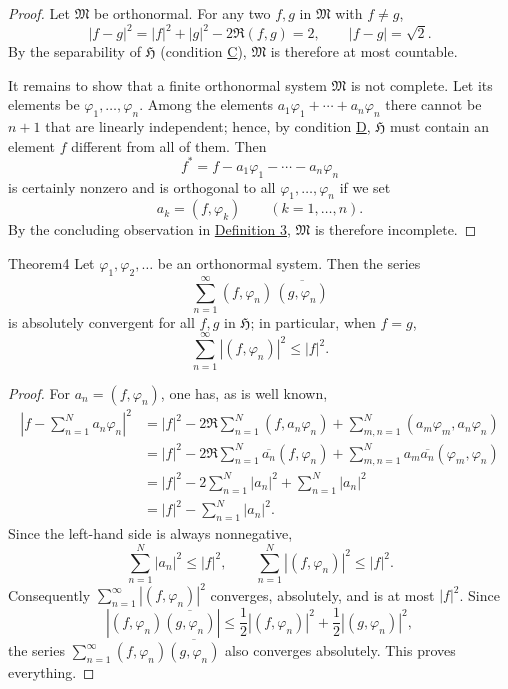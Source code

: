 ﻿\documentclass[paper=b5,fontsize=13pt,bookmarkpackage=false,twoside]{scrartcl}
\begin{document}
\begin{proof}
Let $\mathfrak M$ be orthonormal. For any two $f,g$ in $\mathfrak M$ with $f\ne g$,
\[
 |f-g|^2=|f|^2+|g|^2-2\Re(f,g)=2,
 \qquad
 |f-g|=\sqrt2.
\]
By the separability of $\mathfrak H$ (condition \hyperref[axiom:C]{C}), $\mathfrak M$ is therefore at most countable.

It remains to show that a finite orthonormal system $\mathfrak M$ is not complete. Let its elements be $\varphi_1,\ldots,\varphi_n$. Among the elements $a_1\varphi_1+\cdots+a_n\varphi_n$ there cannot be $n+1$ that are linearly independent; hence, by condition \hyperref[axiom:D]{D}, $\mathfrak H$ must contain an element $f$ different from all of them. Then
\[
 f^*=f-a_1\varphi_1-\cdots-a_n\varphi_n
\]
is certainly nonzero and is orthogonal to all $\varphi_1,\ldots,\varphi_n$ if we set
\[
 a_k=(f,\varphi_k)
 \qquad(k=1,\ldots,n).
\]
By the concluding observation in \hyperref[def:3]{Definition 3}, $\mathfrak M$ is therefore incomplete.
\end{proof}

\begin{namedstatement}{Theorem}{4}\label{thm:4}
Let $\varphi_1,\varphi_2,\ldots$ be an orthonormal system. Then the series
\[
 \sum_{n=1}^{\infty}(f,\varphi_n)\,
 \overline{(g,\varphi_n)}
\]
is absolutely convergent for all $f,g$ in $\mathfrak H$; in particular, when $f=g$,
\[
 \sum_{n=1}^{\infty}|(f,\varphi_n)|^2\le|f|^2.
\]
\end{namedstatement}

\begin{proof}
For $a_n=(f,\varphi_n)$, one has, as is well known,
\begin{align*}
 \left|f-\sum_{n=1}^{N}a_n\varphi_n\right|^2
 &=
 |f|^2
 -2\Re\sum_{n=1}^{N}(f,a_n\varphi_n)
 +\sum_{m,n=1}^{N}(a_m\varphi_m,a_n\varphi_n)\\
 &=
 |f|^2
 -2\Re\sum_{n=1}^{N}\overline{a_n}(f,\varphi_n)
 +\sum_{m,n=1}^{N}a_m\overline{a_n}(\varphi_m,\varphi_n)\\
 &=
 |f|^2-2\sum_{n=1}^{N}|a_n|^2+\sum_{n=1}^{N}|a_n|^2\\
 &=
 |f|^2-\sum_{n=1}^{N}|a_n|^2.
\end{align*}
Since the left-hand side is always nonnegative,
\[
 \sum_{n=1}^{N}|a_n|^2\le|f|^2,
 \qquad
 \sum_{n=1}^{N}|(f,\varphi_n)|^2\le|f|^2.
\]
Consequently $\sum_{n=1}^{\infty}|(f,\varphi_n)|^2$ converges, absolutely, and is at most $|f|^2$. Since
\[
 \left|(f,\varphi_n)\overline{(g,\varphi_n)}\right|
 \le
 \frac12|(f,\varphi_n)|^2
 +
 \frac12|(g,\varphi_n)|^2,
\]
the series $\sum_{n=1}^{\infty}(f,\varphi_n)\overline{(g,\varphi_n)}$ also converges absolutely. This proves everything.
\end{proof}
\end{document}
